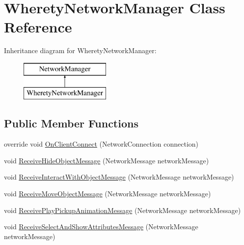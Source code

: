 \hypertarget{class_wherety_network_manager}{}\section{Wherety\+Network\+Manager Class Reference}
\label{class_wherety_network_manager}
Inheritance diagram for Wherety\+Network\+Manager\+:\begin{figure}[H]
\begin{center}
\leavevmode
\includegraphics[height=2.000000cm]{class_wherety_network_manager}
\end{center}
\end{figure}
\subsection*{Public Member Functions}
\begin{DoxyCompactItemize}
\item 
override void \mbox{\hyperlink{class_wherety_network_manager_a6d43d882c74b5a92aa0fd5110de64070}{On\+Client\+Connect}} (Network\+Connection connection)
\item 
void \mbox{\hyperlink{class_wherety_network_manager_a6e186d393c4ed2142104942b3cb34565}{Receive\+Hide\+Object\+Message}} (Network\+Message network\+Message)
\item 
void \mbox{\hyperlink{class_wherety_network_manager_ab3b64000541e3ec84be5de029fa23327}{Receive\+Interact\+With\+Object\+Message}} (Network\+Message network\+Message)
\item 
void \mbox{\hyperlink{class_wherety_network_manager_a481b9ef40f177e7c95ea9552ba6fefa7}{Receive\+Move\+Object\+Message}} (Network\+Message network\+Message)
\item 
void \mbox{\hyperlink{class_wherety_network_manager_a5f80307ac75bac2c91c9d856f9599fc3}{Receive\+Play\+Pickup\+Animation\+Message}} (Network\+Message network\+Message)
\item 
void \mbox{\hyperlink{class_wherety_network_manager_a474f4d25df96e54eaa17593694ed8c2d}{Receive\+Select\+And\+Show\+Attributes\+Message}} (Network\+Message network\+Message)
\end{DoxyCompactItemize}
